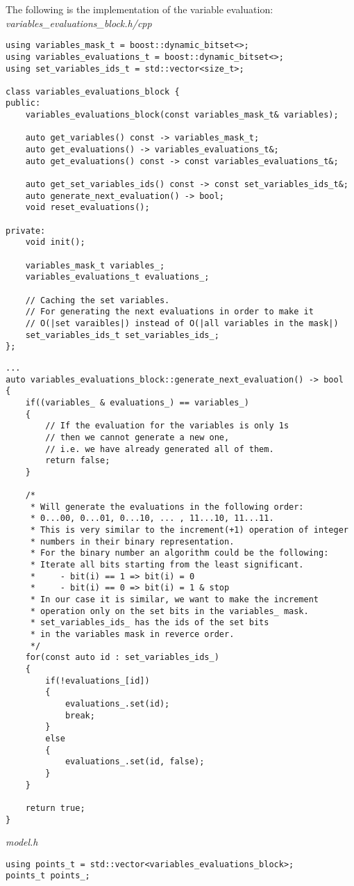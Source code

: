 \documentclass{article}
\begin{document}
	The following is the implementation of the variable evaluation:
\newpage
\noindent
\textit{variables\_evaluations\_block.h/cpp}
\begin{lstlisting}
using variables_mask_t = boost::dynamic_bitset<>;
using variables_evaluations_t = boost::dynamic_bitset<>;
using set_variables_ids_t = std::vector<size_t>;

class variables_evaluations_block {
public:
    variables_evaluations_block(const variables_mask_t& variables);

    auto get_variables() const -> variables_mask_t;
    auto get_evaluations() -> variables_evaluations_t&;
    auto get_evaluations() const -> const variables_evaluations_t&;

    auto get_set_variables_ids() const -> const set_variables_ids_t&;
    auto generate_next_evaluation() -> bool;
    void reset_evaluations();

private:
    void init();

    variables_mask_t variables_;
    variables_evaluations_t evaluations_;

    // Caching the set variables.
    // For generating the next evaluations in order to make it
    // O(|set varaibles|) instead of O(|all variables in the mask|)
    set_variables_ids_t set_variables_ids_;
};
\end{lstlisting}
\newpage
\begin{lstlisting}
...
auto variables_evaluations_block::generate_next_evaluation() -> bool
{
    if((variables_ & evaluations_) == variables_)
    {
        // If the evaluation for the variables is only 1s
        // then we cannot generate a new one,
        // i.e. we have already generated all of them.
        return false;
    }

    /*
     * Will generate the evaluations in the following order:
     * 0...00, 0...01, 0...10, ... , 11...10, 11...11.
     * This is very similar to the increment(+1) operation of integer
     * numbers in their binary representation.
     * For the binary number an algorithm could be the following:
     * Iterate all bits starting from the least significant.
     *     - bit(i) == 1 => bit(i) = 0
     *     - bit(i) == 0 => bit(i) = 1 & stop
     * In our case it is similar, we want to make the increment
     * operation only on the set bits in the variables_ mask.
     * set_variables_ids_ has the ids of the set bits
     * in the variables mask in reverce order.
     */
    for(const auto id : set_variables_ids_)
    {
        if(!evaluations_[id])
        {
            evaluations_.set(id);
            break;
        }
        else
        {
            evaluations_.set(id, false);
        }
    }

    return true;
}
\end{lstlisting}
\noindent
\textit{model.h}
\begin{lstlisting}
using points_t = std::vector<variables_evaluations_block>;
points_t points_;
\end{lstlisting}
\end{document}
